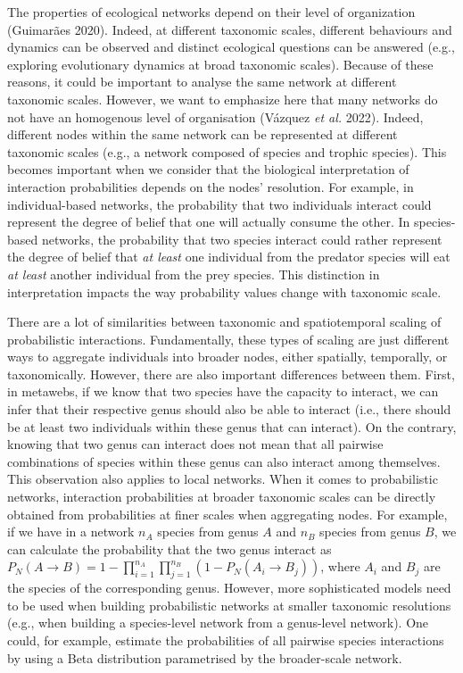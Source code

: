 \documentclass[10pt,oneside]{article}
\begin{document}
The properties of ecological networks depend on their level of
organization (Guimarães 2020). Indeed, at different taxonomic scales,
different behaviours and dynamics can be observed and distinct
ecological questions can be answered (e.g., exploring evolutionary
dynamics at broad taxonomic scales). Because of these reasons, it could
be important to analyse the same network at different taxonomic scales.
However, we want to emphasize here that many networks do not have an
homogenous level of organisation (Vázquez \emph{et al.} 2022). Indeed,
different nodes within the same network can be represented at different
taxonomic scales (e.g., a network composed of species and trophic
species). This becomes important when we consider that the biological
interpretation of interaction probabilities depends on the nodes'
resolution. For example, in individual-based networks, the probability
that two individuals interact could represent the degree of belief that
one will actually consume the other. In species-based networks, the
probability that two species interact could rather represent the degree
of belief that \emph{at least} one individual from the predator species
will eat \emph{at least} another individual from the prey species. This
distinction in interpretation impacts the way probability values change
with taxonomic scale.

There are a lot of similarities between taxonomic and spatiotemporal
scaling of probabilistic interactions. Fundamentally, these types of
scaling are just different ways to aggregate individuals into broader
nodes, either spatially, temporally, or taxonomically. However, there
are also important differences between them. First, in metawebs, if we
know that two species have the capacity to interact, we can infer that
their respective genus should also be able to interact (i.e., there
should be at least two individuals within these genus that can
interact). On the contrary, knowing that two genus can interact does not
mean that all pairwise combinations of species within these genus can
also interact among themselves. This observation also applies to local
networks. When it comes to probabilistic networks, interaction
probabilities at broader taxonomic scales can be directly obtained from
probabilities at finer scales when aggregating nodes. For example, if we
have in a network \(n_A\) species from genus \(A\) and \(n_B\) species
from genus \(B\), we can calculate the probability that the two genus
interact as
\(P_N(A \rightarrow B) = 1 - \prod_{i = 1}^{n_A}\prod_{j = 1}^{n_B}(1 - P_N(A_i \rightarrow B_j))\),
where \(A_i\) and \(B_j\) are the species of the corresponding genus.
However, more sophisticated models need to be used when building
probabilistic networks at smaller taxonomic resolutions (e.g., when
building a species-level network from a genus-level network). One could,
for example, estimate the probabilities of all pairwise species
interactions by using a Beta distribution parametrised by the
broader-scale network.
\end{document}
